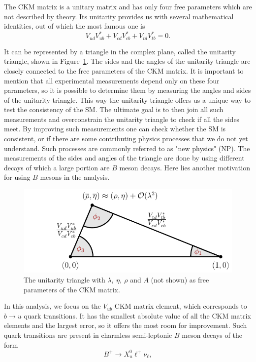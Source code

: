 The CKM matrix is a unitary matrix and has only four free parameters which are not described by theory. Its unitarity provides us with several mathematical identities, out of which the most famous one is
\begin{equation}
V_{ud}V_{ub}^* + V_{cd}V_{cb}^* + V_{td}V_{tb}^* = 0.
\end{equation}

It can be represented by a triangle in the complex plane, called the unitarity triangle, shown in Figure~\ref{ut}. The sides and the angles of the unitarity triangle are closely connected to the free parameters of the CKM matrix. It is important to mention that all experimental measurements depend only on these four parameters, so it is possible to determine them by measuring the angles and sides of the unitarity triangle. This way the unitarity triangle offers us a unique way to test the consistency of the SM. The ultimate goal is to then join all such measurements and overconstrain the unitarity triangle to check if all the sides meet. By improving such measurements one can check whether the SM is consistent, or if there are some contributing physics processes that we do not yet understand. Such processes are commonly referred to as "new physics" (NP). The measurements of the sides and angles of the triangle are done by using different decays of which a large portion are $B$ meson decays. Here lies another motivation for using $B$ mesons in the analysis.

\begin{figure}[H]
\centering
\includegraphics[scale=1]{texfig/UT_Triangle}
\caption{The unitarity triangle with $\lambda,~\eta,~\rho$ and $A$ (not shown) as free parameters of the CKM matrix.}
\label{ut}
\end{figure}

In this analysis, we focus on the $V_{ub}$ CKM matrix element, which corresponds to $b \to u$ quark transitions. It has the smallest absolute value of all the CKM matrix elements and the largest error, so it offers the most room for improvement. Such quark transitions are present in charmless semi-leptonic $B$ meson decays of the form
\begin{equation}
B^+ \to X_u^0 \ell^+ \nu_\ell,
\end{equation}

